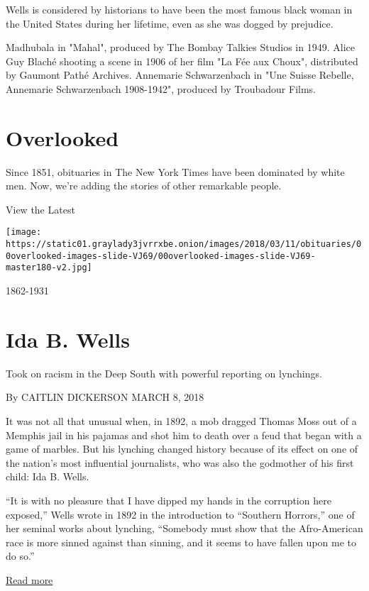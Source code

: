 Wells is considered by historians to have been the most famous black
woman in the United States during her lifetime, even as she was dogged
by prejudice.

Madhubala in "Mahal", produced by The Bombay Talkies Studios in 1949.
Alice Guy Blaché shooting a scene in 1906 of her film "La Fée aux
Choux", distributed by Gaumont Pathé Archives. Annemarie Schwarzenbach
in "Une Suisse Rebelle, Annemarie Schwarzenbach 1908-1942", produced by
Troubadour Films.

\hypertarget{overlooked}{%
\section{Overlooked}\label{overlooked}}

Since 1851, obituaries in The New York Times have been dominated by
white men. Now, we're adding the stories of other remarkable people.

\protect\hyperlink{latest}{}

View the Latest

\texttt{[image: https://static01.graylady3jvrrxbe.onion/images/2018/03/11/obituaries/00overlooked-images-slide-VJ69/00overlooked-images-slide-VJ69-master180-v2.jpg]}

1862-1931

\hypertarget{ida-b-wells}{%
\section{Ida B. Wells}\label{ida-b-wells}}

Took on racism in the Deep South with powerful reporting on lynchings.

By CAITLIN DICKERSON MARCH 8, 2018

It was not all that unusual when, in 1892, a mob dragged Thomas Moss out
of a Memphis jail in his pajamas and shot him to death over a feud that
began with a game of marbles. But his lynching changed history because
of its effect on one of the nation's most influential journalists, who
was also the godmother of his first child: Ida B. Wells.

``It is with no pleasure that I have dipped my hands in the corruption
here exposed,'' Wells wrote in 1892 in the introduction to ``Southern
Horrors,'' one of her seminal works about lynching, ``Somebody must show
that the Afro-American race is more sinned against than sinning, and it
seems to have fallen upon me to do so.''

\href{https://www.nytimes3xbfgragh.onion/interactive/2018/obituaries/overlooked-ida-b-wells.html}{Read
more}

